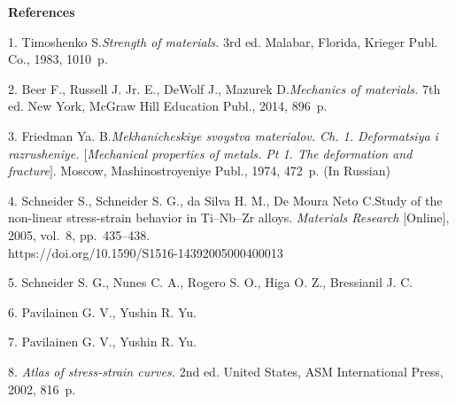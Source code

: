 

{\small



\vskip6mm

\noindent \textbf{References} }

\vskip 2mm

{\footnotesize



 1. {Timoshenko S.}\;\;\emph{Strength of materials.} 3rd
ed. Malabar, Florida, Krieger Publ. Co., 1983, 1010~p.

 2. {Beer F., Russell J. Jr. E., DeWolf J., Mazurek
D.}\;\;\emph{Mechanics of materials.} 7th ed. New York, McGraw
Hill Education Publ., 2014, 896~p.

 3. {Friedman Ya. B.}\;\;\emph{Mekhanicheskiye svoystva
materialov. Ch. 1. Deformatsiya i razrusheniye. $[$Mechanical
properties of metals. Pt 1. The deformation and fracture$]$}.
Moscow, Mashinostroyeniye Publ., 1974, 472~p. (In Russian)

 4. {Schneider S., Schneider S. G., da Silva H. M., De
Moura Neto C.}\;\;Study of the non-linear stress-strain behavior
in Ti--Nb--Zr alloys. \emph{Materials\; Research} [Online], 2005,
vol.~8, pp.~435--438.\\
https://doi.org/10.1590/S1516-14392005000400013

 5. {Schneider S. G., Nunes C. A., Rogero S. O., Higa O.
Z., Bressianil J. C.}\;

 6. {Pavilainen G. V., Yushin R. Yu.}\;

 7. {Pavilainen G. V., Yushin R. Yu.}\;

 8. {\emph{Atlas of stress-strain curves.} 2nd ed.
United States, ASM International Press, 2002, 816~p.}

}
